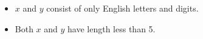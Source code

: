 \begin{itemize}
\tightlist
\item $x$ and $y$ consist of only English letters and digits.
\item Both $x$ and $y$ have length less than 5.
\end{itemize}
